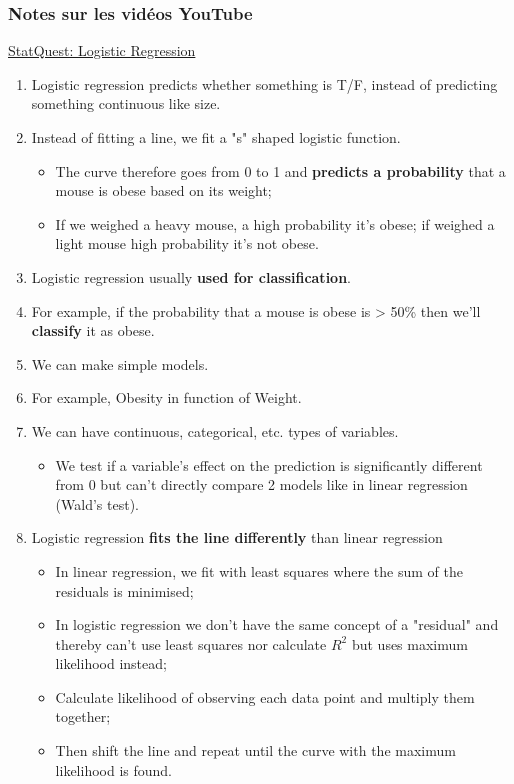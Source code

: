\documentclass[12pt, titlepage, french]{report}
\begin{document}
\subsubsection{Notes sur les vidéos YouTube}

\begin{YTB_SUMM}{\href{https://www.youtube.com/watch?v=yIYKR4sgzI8}{StatQuest: Logistic Regression}}
\begin{enumerate}
	\item	Logistic regression predicts whether something is T/F, instead of predicting something continuous like size.
	\item	Instead of fitting a line, we fit a "s" shaped logistic function.
	\begin{itemize}
		\item	The curve therefore goes from 0 to 1 and \textbf{predicts a probability} that a mouse is obese based on its weight;
		\item	If we weighed a heavy mouse, a high probability it's obese; if weighed a light mouse high probability it's not obese.
	\end{itemize}
	\item	Logistic regression usually \textbf{used for classification}.
	\item[]	For example, if the probability that a mouse is obese is > 50\% then we'll \textbf{classify} it as obese.
	\item	We can make simple models. 
	\item[]	For example, Obesity in function of Weight.
	\item	We can have continuous, categorical, etc. types of variables.
	\begin{itemize}
		\item	We test if a variable's effect on the prediction is significantly different from 0 but can't directly compare 2 models like in linear regression (Wald's test).
	\end{itemize}
	\item	Logistic regression \textbf{fits the line differently} than linear regression
	\begin{itemize}
		\item	In linear regression, we fit with least squares where the sum of the residuals is minimised;
		\item	In logistic regression we don't have the same concept of a "residual" and thereby can't use least squares nor calculate $R^{2}$ but uses maximum likelihood instead;
		\item	Calculate likelihood of observing each data point and multiply them together;
		\item	Then shift the line and repeat until the curve with the maximum likelihood is found.
	\end{itemize}
\end{enumerate}
\end{YTB_SUMM}
\end{document}
